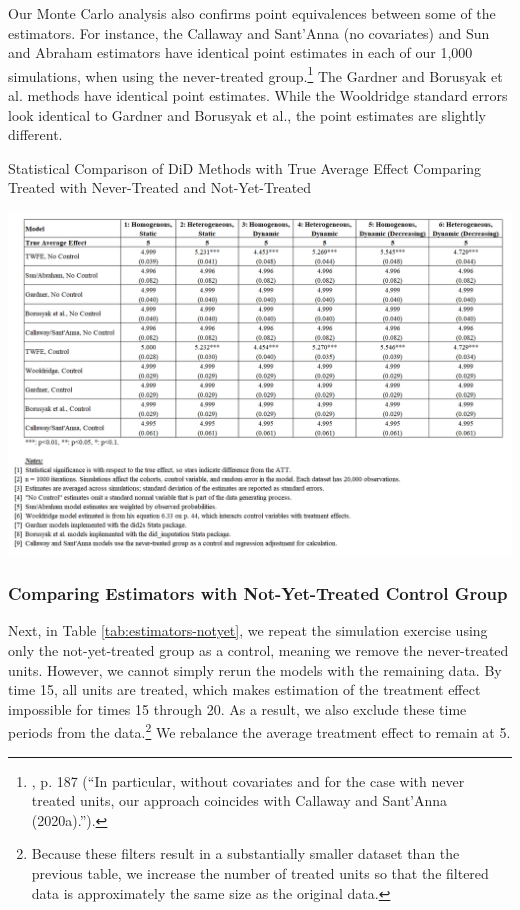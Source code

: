 \documentclass[12pt]{article}
\begin{document}
Our Monte Carlo analysis also confirms point equivalences between some of the estimators. For instance, the Callaway and Sant’Anna (no covariates) and Sun and Abraham estimators have identical point estimates in each of our 1,000 simulations, when using the never-treated group.\footnote{\citet{sunabr2021a}, p. 187 (“In particular, without covariates and for the case with never treated units, our approach coincides with Callaway and Sant’Anna (2020a).”).}  The Gardner and Borusyak et al. methods have identical point estimates. While the Wooldridge standard errors look identical to Gardner and Borusyak et al., the point estimates are slightly different.
\begin{table}[H]
    \centering
    \caption{Statistical Comparison of DiD Methods with True Average Effect
Comparing Treated with Never-Treated and Not-Yet-Treated}
    \includegraphics[width=6in]{Figures/Table 1.png}
    \label{tab:estimators-never}
\end{table}

\subsubsection{Comparing Estimators with Not-Yet-Treated Control Group}
Next, in Table \ref{tab:estimators-notyet}, we repeat the simulation exercise using only the not-yet-treated group as a control, meaning we remove the never-treated units. However, we cannot simply rerun the models with the remaining data. By time 15, all units are treated, which makes estimation of the treatment effect impossible for times 15 through 20. As a result, we also exclude these time periods from the data.\footnote{Because these filters result in a substantially smaller dataset than the previous table, we increase the number of treated units so that the filtered data is approximately the same size as the original data.}  We rebalance the average treatment effect to remain at 5. 
\end{document}
